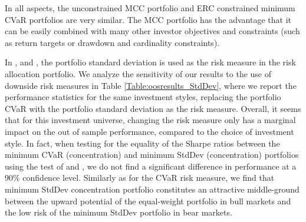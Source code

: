 \documentclass[12pt,a4paper]{article}
\begin{document}
In all aspects, the unconstrained MCC portfolio and ERC constrained minimum CVaR portfolios are very similar. The MCC portfolio has the
advantage that it can be easily combined with many other investor objectives and constraints (such as return targets or drawdown and cardinality constraints).


In \citet{Maillard2010}, \citet{Qian2005} and \citet{Zhu2010}, the portfolio standard deviation is used as the risk measure in the risk allocation portfolio. We analyze the sensitivity of our results to the use of downside risk measures in Table \ref{Table:oosresults_StdDev}, where we report the performance statistics for the same investment styles, replacing the portfolio CVaR with the portfolio standard deviation as the risk measure. Overall, it seems that for this investment universe,  changing the risk measure only has a marginal impact on the out of sample performance, compared to the choice of investment style. In fact, when testing for the equality of the Sharpe ratios between the minimum CVaR (concentration) and minimum StdDev (concentration) portfolios using the test of \citet{JobsonKorkie1981} and \citet{Memmel2003}, we do not find a significant difference in performance at a 90\% confidence level.  Similarly as for the CVaR risk measure, we find that minimum StdDev concentration portfolio constitutes an attractive middle-ground between the upward potential of the equal-weight portfolio in bull markets and the low risk of the minimum StdDev portfolio in bear markets.
\end{document}

